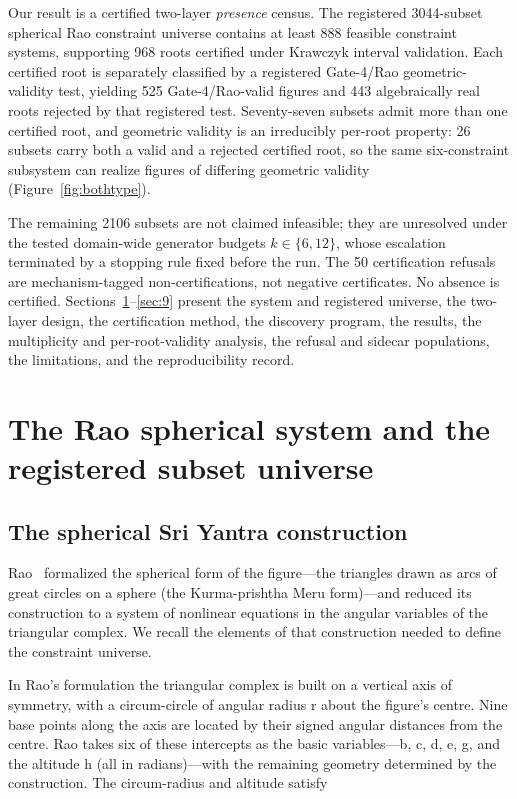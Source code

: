 \documentclass[pdflatex,sn-mathphys-num]{sn-jnl}
\begin{document}
Our result is a certified two-layer \emph{presence} census. The registered 3044-subset spherical Rao constraint universe contains at least 888 feasible constraint systems, supporting 968 roots certified under Krawczyk interval validation. Each certified root is separately classified by a registered Gate-4/Rao geometric-validity test, yielding 525 Gate-4/Rao-valid figures and 443
algebraically real roots rejected by that registered test. Seventy-seven subsets admit more than one certified root, and geometric validity is an irreducibly per-root property: 26 subsets carry both a valid and a rejected certified root, so the same six-constraint subsystem can realize figures of differing
geometric validity (Figure~\ref{fig:bothtype}).

The remaining 2106 subsets are not claimed infeasible; they are unresolved under the tested domain-wide generator budgets $k\in\{6,12\}$, whose escalation terminated by a stopping rule fixed before the run. The 50 certification refusals are mechanism-tagged non-certifications, not negative certificates. No absence is certified. Sections~\ref{sec:1}--\ref{sec:9} present the system and
registered universe, the two-layer design, the certification method, the discovery program, the results, the multiplicity and per-root-validity analysis, the refusal and sidecar populations, the limitations, and the reproducibility record.

\section{The Rao spherical system and the registered subset universe}\label{sec:1}

\subsection{The spherical Sri Yantra construction}\label{sec:1.1}

Rao~\cite{rao1998} formalized the spherical form of the figure---the triangles drawn as arcs of great circles on a sphere (the Kurma-prishtha Meru form)---and reduced its construction to a system of nonlinear equations in the angular variables of the triangular complex. We recall the elements of that construction needed to define the constraint universe.

In Rao's formulation the triangular complex is built on a vertical axis of symmetry, with a circum-circle of angular radius r about the figure's centre. Nine base points along the axis are located by their signed angular distances from the centre. Rao takes six of these intercepts as the basic variables---b, c, d, e, g, and the altitude h (all in radians)---with the remaining geometry determined by the construction. The circum-radius and altitude satisfy
\end{document}
